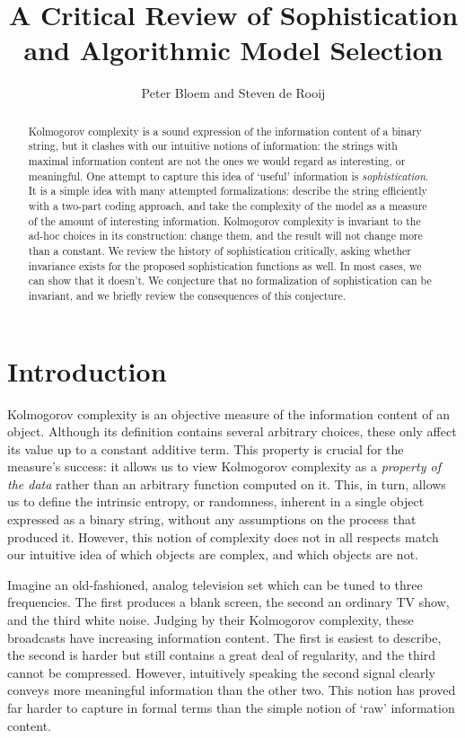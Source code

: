 \documentclass{style/llncs}
\title{A Critical Review of Sophistication and Algorithmic Model Selection}
\author{Peter Bloem and Steven de Rooij}
\institute{
  System and Network Engineering Group, \\University of Amsterdam, the Netherlands\\
  \email{uva@peterbloem.nl, steven.de.rooij@gmail.com}
}
\begin{document}
\maketitle

\begin{abstract}
Kolmogorov complexity is a sound expression of the information content of a binary string, but it clashes with our intuitive notions of information: the strings with maximal information content are not the ones we would regard as interesting, or meaningful. One attempt to capture this idea of `useful' information is \emph{sophistication}. It is a simple idea with many attempted formalizations: describe the string efficiently with a two-part coding approach, and take the complexity of the model as a measure of the amount of interesting information. Kolmogorov complexity is invariant to the ad-hoc choices in its construction: change them, and the result will not change more than a constant. We review the history of sophistication critically, asking whether invariance exists for the proposed sophistication functions as well. In most cases, we can show that it doesn't. We conjecture that no formalization of sophistication can be invariant, and we briefly review the consequences of this conjecture.
\end{abstract}

\section{Introduction}

\noindent Kolmogorov complexity is an objective measure of the information content of an object. Although its definition contains several arbitrary choices, these only affect its value up to a constant additive term. This property is crucial for the measure's success: it allows us to view Kolmogorov complexity as a \emph{property of the data} rather than an arbitrary function computed on it. This, in turn, allows us to define the intrinsic entropy, or randomness, inherent in a single object expressed as a binary string, without any assumptions on the process that produced it. However, this notion of complexity does not in all respects match our intuitive idea of which objects are complex, and which objects are not.

Imagine an old-fashioned, analog television set which can be tuned to three frequencies. The first produces a blank screen, the second an ordinary TV show, and the third white noise. Judging by their Kolmogorov complexity, these  broadcasts have increasing information content. The first is easiest to describe, the second is harder but still contains a great deal of regularity, and the third cannot be compressed. However, intuitively speaking the second signal clearly conveys more meaningful information than the other two. This notion has proved far harder to capture in formal terms than the simple notion of `raw' information content. 
\end{document}
